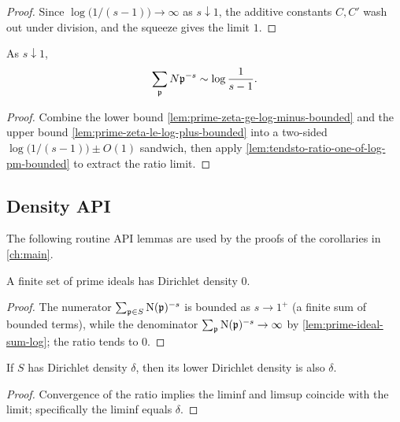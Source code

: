 \begin{proof}
  \leanok
  Since $\log\bigl(1/(s-1)\bigr) \to \infty$ as $s \downarrow 1$, the
  additive constants $C, C'$ wash out under division, and the squeeze
  gives the limit $1$.
\end{proof}

\begin{lemma}\label{lem:prime-ideal-sum-log}
  \leanok
  As $s\downarrow 1$,
  \[
    \sum_{\mathfrak{p}} N\mathfrak{p}^{-s} \sim \log\frac{1}{s-1}.
  \]
\end{lemma}

\begin{proof}
  \leanok
  Combine the lower bound \cref{lem:prime-zeta-ge-log-minus-bounded} and
  the upper bound \cref{lem:prime-zeta-le-log-plus-bounded} into a
  two-sided $\log\bigl(1/(s-1)\bigr) \pm O(1)$ sandwich, then apply
  \cref{lem:tendsto-ratio-one-of-log-pm-bounded} to extract the ratio
  limit.
\end{proof}

\subsection*{Density API}

The following routine API lemmas are used by the proofs of the
corollaries in \cref{ch:main}.

\begin{lemma}\label{lem:has-density-finite}
  A finite set of prime ideals has Dirichlet density $0$.
\end{lemma}

\begin{proof}
  The numerator $\sum_{\mathfrak{p}\in S}\mathrm{N}(\mathfrak{p})^{-s}$ is bounded as $s \to
  1^+$ (a finite sum of bounded terms), while the denominator
  $\sum_{\mathfrak{p}} \mathrm{N}(\mathfrak{p})^{-s}\to\infty$ by
  \cref{lem:prime-ideal-sum-log}; the ratio tends to $0$.
\end{proof}

\begin{lemma}\label{lem:density-implies-lower}
  If $S$ has Dirichlet density $\delta$, then its lower Dirichlet
  density is also $\delta$.
\end{lemma}

\begin{proof}
  Convergence of the ratio implies the liminf and limsup coincide with
  the limit; specifically the liminf equals $\delta$.
\end{proof}

